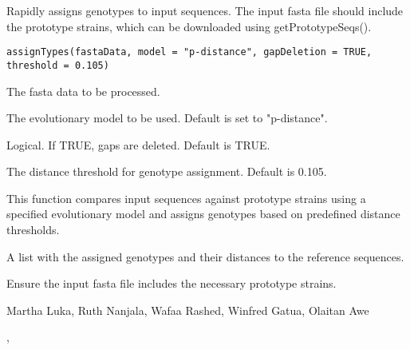 \documentclass[a4paper]{book}
\begin{document}
%
\begin{Description}
Rapidly assigns genotypes to input sequences. 
The input fasta file should include the prototype strains, 
which can be downloaded using getPrototypeSeqs().
\end{Description}
%
\begin{Usage}
\begin{verbatim}
assignTypes(fastaData, model = "p-distance", gapDeletion = TRUE, threshold = 0.105)
\end{verbatim}
\end{Usage}
%
\begin{Arguments}
\begin{ldescription}
\item[\code{fastaData}] 
The fasta data to be processed.

\item[\code{model}] 
The evolutionary model to be used. Default is set to "p-distance".

\item[\code{gapDeletion}] 
Logical. If TRUE, gaps are deleted. Default is TRUE.

\item[\code{threshold}] 
The distance threshold for genotype assignment. Default is 0.105.

\end{ldescription}
\end{Arguments}
%
\begin{Details}
This function compares input sequences against prototype strains using a 
specified evolutionary model and assigns genotypes based on predefined distance thresholds.
\end{Details}
%
\begin{Value}
A list with the assigned genotypes and their distances to the reference sequences.
\end{Value}
%
\begin{Note}
Ensure the input fasta file includes the necessary prototype strains.
\end{Note}
%
\begin{Author}
Martha Luka, Ruth Nanjala, Wafaa Rashed, Winfred Gatua, Olaitan Awe 
\end{Author}
%
\begin{SeeAlso}
, 
\end{SeeAlso}
\end{document}
